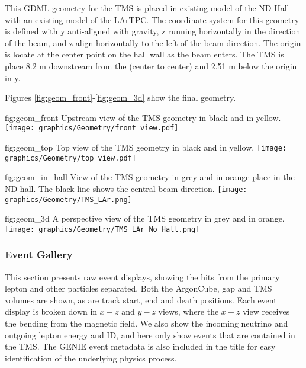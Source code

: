 This GDML geometry for the TMS is placed in existing model of the ND Hall with an existing model of the LArTPC. The coordinate system for this geometry is defined with y anti-aligned with gravity, z running horizontally in the direction of the beam, and z align horizontally to the left of the beam direction. The origin is locate at the center point on the hall wall as the beam enters. The TMS is place 8.2 m downstream from the  (center to center) and 2.51 m below the origin in y.   

Figures \ref{fig:geom_front}-\ref{fig:geom_3d} show the final geometry.

\begin{dunefigure}[]{fig:geom_front}
{Upstream view of the TMS geometry in black and  in yellow.}
\texttt{[image: graphics/Geometry/front\_view.pdf]}
\end{dunefigure}
\begin{dunefigure}[]{fig:geom_top}
{Top view of the TMS geometry in black and  in yellow.}
\texttt{[image: graphics/Geometry/top\_view.pdf]}
\end{dunefigure}
\begin{dunefigure}[]{fig:geom_in_hall}
{View of the TMS geometry in grey and  in orange place in the ND hall. The black line shows the central beam direction. }
\texttt{[image: graphics/Geometry/TMS\_LAr.png]}
\end{dunefigure}
\begin{dunefigure}[]{fig:geom_3d}
{A perspective view of the TMS geometry in grey and  in orange.}
\texttt{[image: graphics/Geometry/TMS\_LAr\_No\_Hall.png]}
\end{dunefigure}

\subsubsection{Event Gallery}
This section presents raw event displays, showing the hits from the primary lepton and other particles separated. Both the ArgonCube, gap and TMS volumes are shown, as are track start, end and death positions. Each event display is broken down in $x-z$ and $y-z$ views, where the $x-z$ view receives the bending from the magnetic field. We also show the incoming neutrino and outgoing lepton energy and ID, and here only show events that are contained in the TMS. The GENIE event metadata is also included in the title for easy identification of the underlying physics process.

